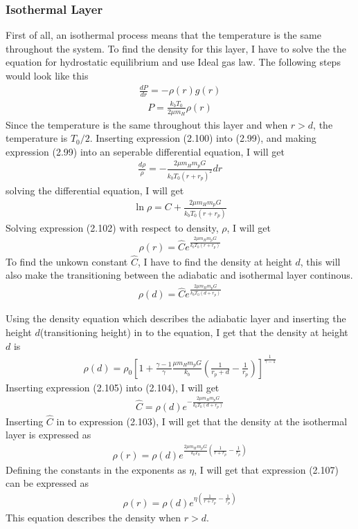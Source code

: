 \documentclass[a4paper,11pt,english]{report}
\begin{document}
\subsubsection{Isothermal Layer} First of all, an isothermal process means that
the temperature is the same throughout the system. To find the density for this
layer, I have to solve the the equation for hydrostatic equilibrium and use
Ideal gas law. The following steps would look like this
\begin{align}
  \frac{dP}{dr} = - \rho (r)g(r)
\end{align}
\begin{align}
  P = \frac{k_{b}T_{0}}{2\mu m_{H}}\rho (r)
\end{align}
Since the temperature is the same throughout this layer and when \(r > d\), the
temperature is \(T_{0}/2\). Inserting expression (2.100) into (2.99), and making
expression (2.99) into an seperable differential equation, I will get
\begin{align}
  \frac{d\rho}{\rho} = -\frac{2\mu m_{H}m_{p}G}{k_{b}T_{0}(r + r_{p})^{2}}dr
\end{align}
solving the differential equation, I will get
\begin{align}
  \ln{\rho} = C + \frac{2\mu m_{H}m_{p}G}{k_{b}T_{0}(r + r_{p})}
\end{align}
Solving expression (2.102) with respect to density, \(\rho\), I will get
\begin{align}
  \rho (r) = \hat{C}e^{\frac{2\mu m_{H}m_{p}G}{k_{b}T_{0}(r + r_{p})}}
\end{align}
To find the unkown constant \(\hat{C}\), I have to find the density at height
\(d\), this will also make the transitioning between the adiabatic and
isothermal layer continous.
\begin{align}
  \rho (d) = \hat{C}e^{\frac{2\mu m_{H}m_{p}G}{k_{b}T_{0}(d + r_{p})}}
\end{align}

Using the density equation which describes the adiabatic
layer and inserting the height \(d\)(transitioning height) in to the
equation, I get that the density at height \(d\) is
\begin{align}
  \rho (d) =
  \rho_{0}[
  1 + \frac{\gamma -1}{\gamma}\frac{\mu
  m_{H}m_{p}G}{k_{b}}(\frac{1}{r_{p}+d} - \frac{1}{r_{p}})
  ]^{\frac{1}{\gamma-1}}
\end{align}
Inserting expression (2.105) into (2.104), I will get
\begin{align}
  \hat{C} = \rho (d)e^{-\frac{2\mu m_{H}m_{p}G}{k_{b}T_{0}(d + r_{p})}}
\end{align}
Inserting \(\hat{C}\) in to expression (2.103), I will get that the density at
the isothermal layer is expressed as
\begin{align}
  \rho (r) = \rho (d)e^{\frac{2\mu m_{H}m_{p}G}{k_{b}T_{0}}(\frac{1}{r + r_{p}}
  - \frac{1}{r_{p}})}
\end{align}
Defining the constants in the exponents as \(\eta\), I will get that expression
(2.107) can be expressed as
\begin{align}
  \rho (r) = \rho (d)e^{\eta(\frac{1}{r + r_{p}}
  - \frac{1}{r_{p}})}
\end{align}
This equation describes the density when \(r > d\).
\end{document}

